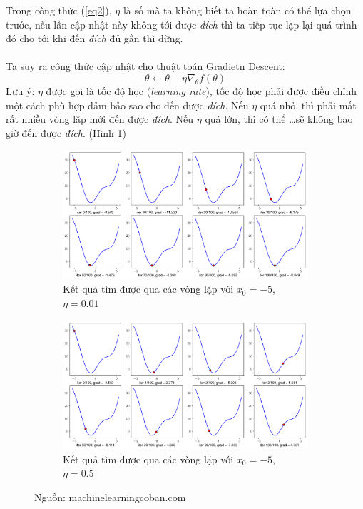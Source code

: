 \documentclass{article}
\begin{document}
Trong công thức (\ref{eq2}), $\eta$ là số mà ta không biết ta hoàn toàn có thể lựa chọn trước, nếu lần cập nhật này không tới được \textit{đích} thì ta tiếp tục lặp lại quá trình đó cho tới khi đến \textit{đích} đủ gần thì dừng. \\\\
Ta suy ra công thức cập nhật cho thuật toán Gradietn Descent:
\begin{equation}
    \theta \leftarrow  \theta - \eta{\nabla_{\theta}}f(\theta)
    \label{eq3}
\end{equation}
\underline{Lưu ý}: $\eta$ được gọi là tốc độ học (\textit{learning rate}), tốc độ học phải được điều chỉnh một cách phù hợp đảm bảo sao cho đến được \textit{đích}. Nếu $\eta$ quá nhỏ, thì phải mất rất nhiều vòng lặp mới đến được \textit{đích}. Nếu $\eta$ quá lớn, thì có thể \ldots sẽ không bao giờ đến được \textit{đích}. (Hình \ref{fig3})
\begin{figure}[ht!]
  \centering
  \begin{subfigure}[b]{\linewidth}
    \includegraphics[width=\linewidth]{gd1d_1.pdf}
    \caption{Kết quả tìm được qua các vòng lặp với $x_0 = -5$, $\eta = 0.01$}
  \end{subfigure}
  \begin{subfigure}[b]{\linewidth}
    \includegraphics[width=\linewidth]{gd1d_2.pdf}
    \caption{Kết quả tìm được qua các vòng lặp với $x_0 = -5$, $\eta = 0.5$}
  \end{subfigure}
  \caption{Nguồn: machinelearningcoban.com}
  \label{fig3}
\end{figure}
\end{document}
